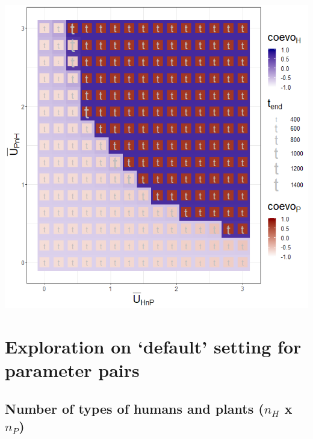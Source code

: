 \documentclass[]{book}
\begin{document}
\includegraphics[width=1\linewidth]{plots/3_twoPar-mU.HnP-mU.PnH_plot}

\newpage

\hypertarget{exploration-on-default-setting-for-parameter-pairs}{%
\section{Exploration on `default' setting for parameter pairs}\label{exploration-on-default-setting-for-parameter-pairs}}

\hypertarget{number-of-types-of-humans-and-plants-n_h-x-n_p}{%
\subsection{\texorpdfstring{Number of types of humans and plants (\(n_{H}\) x \(n_{P}\))}{Number of types of humans and plants (n\_\{H\} x n\_\{P\})}}\label{number-of-types-of-humans-and-plants-n_h-x-n_p}}

\end{document}
